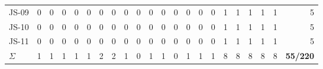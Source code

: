 \documentclass[conference]{IEEEtran}
\begin{document}
\begin{table}[t]
\begin{tabular}{l|ccccc|ccccc|ccccc|ccccc|r}
JS-09 & 0 & 0 & 0 & 0 & 0 & 0 & 0 & 0 & 0 & 0 & 0 & 0 & 0 & 0 & 0 & 1 & 1 & 1 & 1 & 1 &  5 \\
JS-10 & 0 & 0 & 0 & 0 & 0 & 0 & 0 & 0 & 0 & 0 & 0 & 0 & 0 & 0 & 0 & 1 & 1 & 1 & 1 & 1 &  5 \\
JS-11 & 0 & 0 & 0 & 0 & 0 & 0 & 0 & 0 & 0 & 0 & 0 & 0 & 0 & 0 & 0 & 1 & 1 & 1 & 1 & 1 &  5 \\
\midrule
\textbf{$\Sigma$} & 1 & 1 & 1 & 1 & 1 & 2 & 2 & 1 & 0 & 1 & 1 & 0 & 1 & 1 & 1 & 8 & 8 & 8 & 8 & 8 & \textbf{55/220} \\
\bottomrule
\end{tabular}
\end{table}
\end{document}
